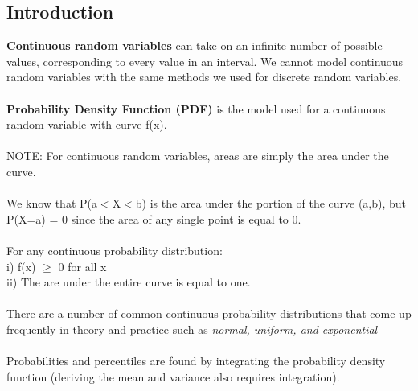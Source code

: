 \documentclass[12pt, a4paper]{article}
\begin{document}
	\subsection{Introduction}
	\textbf{Continuous random variables} can take on an infinite number of possible values, corresponding to every value in an interval. We cannot model continuous random variables with the same methods we used for discrete random variables.\\~\\
	\textbf{Probability Density Function (PDF)} is the model used for a continuous random variable with curve f(x). \\~\\
	NOTE: For continuous random variables, areas are simply the area under the curve. \\~\\
	We know that P(a$<$X$<$b) is the area under the portion of the curve (a,b), but \\ P(X=a) = 0 since the area of any single point is equal to 0. \\~\\
	For any continuous probability distribution: \\
	i) f(x) $\geq$ 0 for all x \\
	ii) The are under the entire curve is equal to one. \\~\\
	There are a number of common continuous probability distributions that come up frequently in theory and practice such as \textit{normal, uniform, and exponential} \\~\\
	Probabilities and percentiles are found by integrating the probability density function (deriving the mean and variance also requires integration). \\~\\
	
\end{document}
